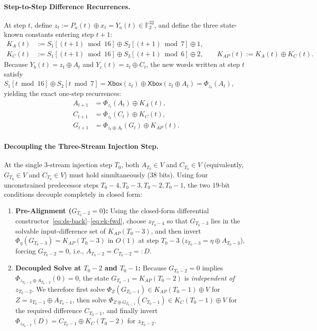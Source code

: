 \documentclass[11pt,a4paper]{article}
\theoremstyle{definition}
\theoremstyle{remark}
\newcommand{\Ftwo}{\mathbb{F}_2}
\newcommand{\Xbox}{\mathsf{Xbox}}
\begin{document}
\paragraph{Step-to-Step Difference Recurrences.}
At step $t$, define $z_t := P_a(t) \oplus x_t = Y_a(t) \in \Ftwo^{32}$, and define the three state-known constants entering step $t + 1$:
\[
\begin{aligned}
K_A(t) &:= S_1[(t+1)\bmod 16] \oplus S_2[(t+1)\bmod 7] \oplus 1, \\
K_C(t) &:= S_1[(t+1)\bmod 16] \oplus S_3[(t+1)\bmod 6] \oplus 2, \qquad
K_{AP}(t) := K_A(t) \oplus K_C(t).
\end{aligned}
\]
Because $Y_b(t) = z_t \oplus A_t$ and $Y_c(t) = z_t \oplus C_t$, the new words written at step $t$ satisfy $S_1[t\bmod 16] \oplus S_2[t\bmod 7] = \Xbox(z_t) \oplus \Xbox(z_t \oplus A_t) = \Phi_{z_t}(A_t)$, yielding the exact one-step recurrences:
\begin{equation}
\label{eq:ACG-rec}
\begin{aligned}
A_{t+1} &= \Phi_{z_t}(A_t) \oplus K_A(t), \\
C_{t+1} &= \Phi_{z_t}(C_t) \oplus K_C(t), \\
G_{t+1} &= \Phi_{z_t \oplus A_t}(G_t) \oplus K_{AP}(t).
\end{aligned}
\end{equation}

\paragraph{Decoupling the Three-Stream Injection Step.}
At the single $3$-stream injection step $T_0$, both $A_{T_0} \in V$ and $C_{T_0} \in V$ (equivalently, $G_{T_0} \in V$ and $C_{T_0} \in V$) must hold simultaneously ($38$ bits). Using four unconstrained predecessor steps $T_0 - 4, T_0 - 3, T_0 - 2, T_0 - 1$, the two $19$-bit conditions decouple completely in closed form:
\begin{enumerate}[leftmargin=2em]
    \item \textbf{Pre-Alignment ($G_{T_0 - 2} = 0$):} Using the closed-form differential constructor~\eqref{eq:ds-back}--\eqref{eq:ek-fwd}, choose $z_{T_0 - 4}$ so that $G_{T_0 - 3}$ lies in the solvable input-difference set of $K_{AP}(T_0 - 3)$, and then invert $\Phi_{\eta}(G_{T_0 - 3}) = K_{AP}(T_0 - 3)$ in $O(1)$ at step $T_0 - 3$ ($z_{T_0 - 3} = \eta \oplus A_{T_0 - 3}$), forcing $G_{T_0 - 2} = 0$, i.e., $A_{T_0 - 2} = C_{T_0 - 2} =: D$.
    \item \textbf{Decoupled Solve at $T_0 - 2$ and $T_0 - 1$:} Because $G_{T_0 - 2} = 0$ implies $\Phi_{z_{T_0 - 2} \oplus A_{T_0 - 2}}(0) = 0$, the state $G_{T_0 - 1} = K_{AP}(T_0 - 2)$ is \emph{independent of $z_{T_0 - 2}$}. We therefore first solve $\Phi_Z(G_{T_0 - 1}) \in K_{AP}(T_0 - 1) \oplus V$ for $Z = z_{T_0 - 1} \oplus A_{T_0 - 1}$, then solve $\Phi_{Z \oplus G_{T_0 - 1}}(C_{T_0 - 1}) \in K_C(T_0 - 1) \oplus V$ for the required difference $C_{T_0 - 1}$, and finally invert $\Phi_{z_{T_0 - 2}}(D) = C_{T_0 - 1} \oplus K_C(T_0 - 2)$ for $z_{T_0 - 2}$.
\end{enumerate}
\end{document}
